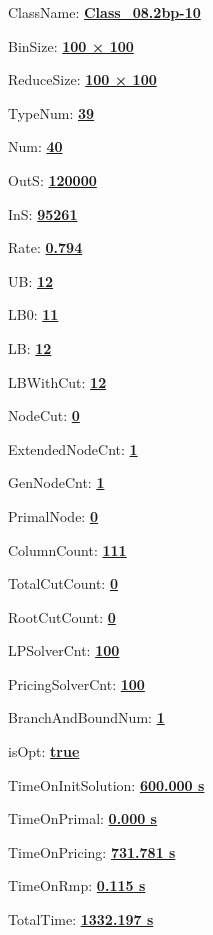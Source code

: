 \documentclass[11pt]{article}
\begin{document}
\pagestyle{empty}


ClassName: \underline{\textbf{Class_08.2bp-10}}
\par
BinSize: \underline{\textbf{100 × 100}}
\par
ReduceSize: \underline{\textbf{100 × 100}}
\par
TypeNum: \underline{\textbf{39}}
\par
Num: \underline{\textbf{40}}
\par
OutS: \underline{\textbf{120000}}
\par
InS: \underline{\textbf{95261}}
\par
Rate: \underline{\textbf{0.794}}
\par
UB: \underline{\textbf{12}}
\par
LB0: \underline{\textbf{11}}
\par
LB: \underline{\textbf{12}}
\par
LBWithCut: \underline{\textbf{12}}
\par
NodeCut: \underline{\textbf{0}}
\par
ExtendedNodeCnt: \underline{\textbf{1}}
\par
GenNodeCnt: \underline{\textbf{1}}
\par
PrimalNode: \underline{\textbf{0}}
\par
ColumnCount: \underline{\textbf{111}}
\par
TotalCutCount: \underline{\textbf{0}}
\par
RootCutCount: \underline{\textbf{0}}
\par
LPSolverCnt: \underline{\textbf{100}}
\par
PricingSolverCnt: \underline{\textbf{100}}
\par
BranchAndBoundNum: \underline{\textbf{1}}
\par
isOpt: \underline{\textbf{true}}
\par
TimeOnInitSolution: \underline{\textbf{600.000 s}}
\par
TimeOnPrimal: \underline{\textbf{0.000 s}}
\par
TimeOnPricing: \underline{\textbf{731.781 s}}
\par
TimeOnRmp: \underline{\textbf{0.115 s}}
\par
TotalTime: \underline{\textbf{1332.197 s}}
\par
\newpage


\end{document}
